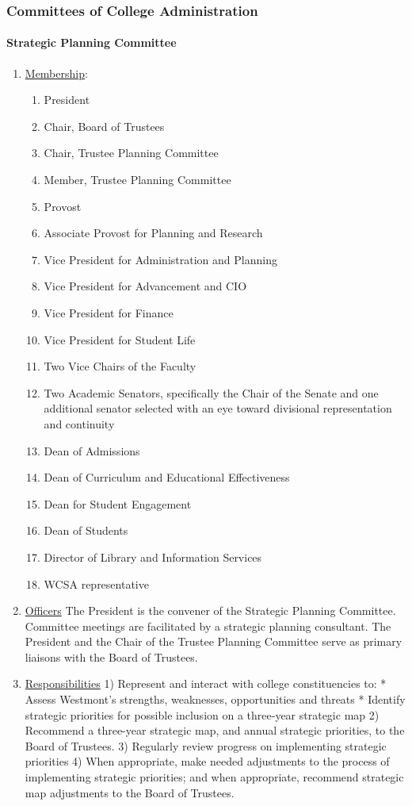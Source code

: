 \documentclass[letterpaper, 11pt]{article}
\begin{document}
		\subsubsection{Committees of College Administration}
			\paragraph{Strategic Planning Committee}
				\begin{enumerate}
					\item{\underline{Membership}:
						\begin{enumerate}
							\item{President}
							\item{Chair, Board of Trustees}
							\item{Chair, Trustee Planning Committee}
							\item{Member, Trustee Planning Committee}
							\item{Provost}
							\item{Associate Provost for Planning and Research}
							\item{Vice President for Administration and Planning}
							\item{Vice President for Advancement and CIO}
							\item{Vice President for Finance}
							\item{Vice President for Student Life}
							\item{Two Vice Chairs of the Faculty}
							\item{Two Academic Senators, specifically the Chair of the Senate and one additional senator selected with an eye toward divisional representation and continuity}
							\item{Dean of Admissions}
							\item{Dean of Curriculum and Educational Effectiveness}
							\item{Dean for Student Engagement}
							\item{Dean of Students}
							\item{Director of Library and Information Services}
							\item{WCSA representative}
						\end{enumerate}
					}
					\item{\underline{Officers}
						The President is the convener of the Strategic Planning Committee.  Committee meetings are facilitated by a strategic planning consultant.  The President and the Chair of the Trustee Planning Committee serve as primary liaisons with the Board of Trustees.}
					\item{\underline{Responsibilities}
						1) Represent and interact with college constituencies to:
						* Assess Westmont's strengths, weaknesses, opportunities and threats
						* Identify strategic priorities for possible inclusion on a three-year strategic map
						2) Recommend a three-year strategic map, and annual strategic priorities, to the Board of Trustees.
						3) Regularly review progress on implementing strategic priorities
						4) When appropriate, make needed adjustments to the process of implementing strategic priorities; and when appropriate, recommend strategic map adjustments to the Board of Trustees.}
				\end{enumerate}
\end{document}
